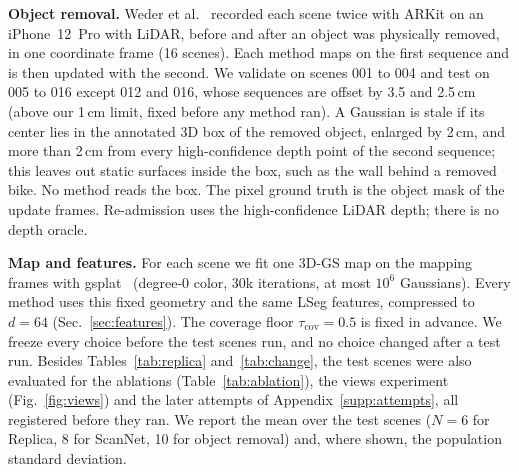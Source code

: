 \documentclass[journal]{IEEEtran}
\newcommand{\secref}[1]{Sec.~\mbox{\ref{#1}}}       %
\begin{document}
\textbf{Object removal.} Weder et al.~\cite{weder2023removing} recorded each scene twice with ARKit on an iPhone~12~Pro with LiDAR, before and after an object was physically removed, in one coordinate frame (16 scenes). Each method maps on the first sequence and is then updated with the second. We validate on scenes 001 to 004 and test on 005 to 016 except 012 and 016, whose sequences are offset by 3.5 and 2.5\,cm (above our 1\,cm limit, fixed before any method ran). A Gaussian is stale if its center lies in the annotated 3D box of the removed object, enlarged by 2\,cm, and more than 2\,cm from every high-confidence depth point of the second sequence; this leaves out static surfaces inside the box, such as the wall behind a removed bike. No method reads the box. The pixel ground truth is the object mask of the update frames. Re-admission uses the high-confidence LiDAR depth; there is no depth oracle.

\textbf{Map and features.} For each scene we fit one 3D-GS map on the mapping frames with gsplat~\cite{ye2024gsplat} (degree-0 color, 30k iterations, at most $10^6$ Gaussians). Every method uses this fixed geometry and the same LSeg features, compressed to $d=64$ (\secref{sec:features}). The coverage floor $\tau_{\mathrm{cov}}=0.5$ is fixed in advance. We freeze every choice before the test scenes run, and no choice changed after a test run. Besides Tables~\ref{tab:replica} and~\ref{tab:change}, the test scenes were also evaluated for the ablations (Table~\ref{tab:ablation}), the views experiment (Fig.~\ref{fig:views}) and the later attempts of Appendix~\ref{supp:attempts}, all registered before they ran. We report the mean over the test scenes ($N=6$ for Replica, 8 for ScanNet, 10 for object removal) and, where shown, the population standard deviation.
\end{document}
